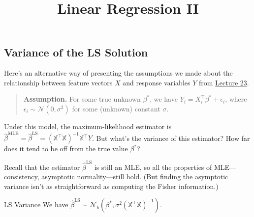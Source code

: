 \title{Linear Regression II}



\subsection{Variance of the LS Solution}

Here's an alternative way of presenting the assumptions
we made about the relationship between feature vectors $X$
and response variables $Y$ from
\href{/18.650/lectures/23/#linear-regression-mle}{Lecture 23}.

\begin{quote}
    \textbf{Assumption.}
    For some true unknown $\beta^*$,
    we have $Y_i = X_i^{\top}\beta^* + \epsilon_i$,
    where $\epsilon_i \sim \mathcal{N}(0, \sigma^2)$
    for some (unknown) constant $\sigma$.
\end{quote}

Under this model, the maximum-likelihood estimator
is $\hat{\beta}^{\mathrm{MLE}} = \hat{\beta}^{\mathrm{LS}}
= (\mathbb{X}^{\top}\mathbb{X})^{-1}\mathbb{X}^{\top}Y$.
But what's the variance of this estimator?
How far does it tend to be off from the true value $\beta^*$?

\begin{remark}
    Recall that the estimator $\hat{\beta}^{\mathrm{LS}}$
    is still an MLE, so all the properties of MLE---consistency,
    asymptotic normality---still hold.
    (But finding the asymptotic variance
    isn't as straightforward as computing the Fisher information.)
\end{remark}

\begin{theorem}{LS Variance}
    We have $\hat{\beta}^{\mathrm{LS}}
    \sim \mathcal{N}_k(\beta^*, \sigma^2(\mathbb{X}^{\top}\mathbb{X})^{-1})$.
\end{theorem}

